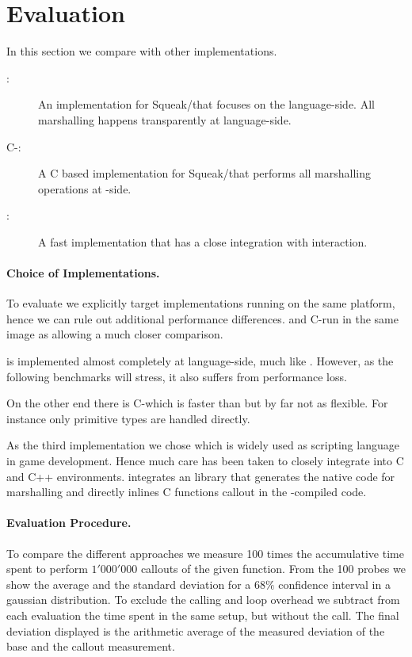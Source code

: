 \section{\NBFFI Evaluation}

In this section we compare \NB with other \FFI implementations.
\begin{description}
	\item[\Alien \FFI:] An \FFI implementation for Squeak/\PH that focuses on the language-side. All marshalling happens transparently at language-side.
	\item[C-\FFI:] A C based \FFI implementation for Squeak/\PH that performs all marshalling operations at \VM-side.
	\item[\LuaJIT:] A fast \Lua implementation that has a close \FFI integration with \JIT interaction.
\end{description}

\paragraph{Choice of \FFI Implementations.}
To evaluate \NB we explicitly target \FFI implementations running on the same platform, hence we can rule out additional performance differences.
\Alien and C-\FFI run in the same \PH image as \NB allowing a much closer comparison.

\Alien \FFI is implemented almost completely at language-side, much like \NB.
However, as the following benchmarks will stress, it also suffers from performance loss.

On the other end there is C-\FFI which is faster than \Alien but by far not as flexible.
For instance only primitive types are handled directly.

As the third implementation we chose \Lua which is widely used as scripting language in game development.
Hence much care has been taken to closely integrate \Lua into C and C++ environments.
\LuaJIT integrates an \FFI library that generates the native code for marshalling and directly inlines C functions callout in the \JIT-compiled code.

\paragraph{Evaluation Procedure.}
To compare the different \FFI approaches we measure 100 times the accumulative time spent to perform $1'000'000$ callouts of the given function.
From the 100 probes we show the average and the standard deviation for a $68\%$ confidence interval in a gaussian distribution.
To exclude the calling and loop overhead we subtract from each evaluation the time spent in the same setup, but without the \FFI call.
The final deviation displayed is the arithmetic average of the measured deviation of the base and the callout measurement.

